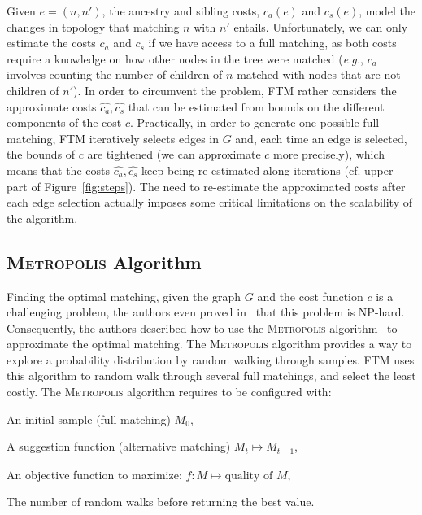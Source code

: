 Given $e=(n, n')$, the ancestry and sibling costs, $c_a(e)$ and $c_s(e)$, model the changes in topology that matching $n$ with $n'$ entails.
Unfortunately, we can only estimate the costs $c_a$ and $c_s$ if we have access to a full matching, as both costs require a knowledge on how other nodes in the tree were matched (\emph{e.g.}, $c_a$ involves counting the number of children of $n$ matched with nodes that are not children of $n'$).
In order to circumvent the problem, FTM rather considers the approximate costs $\hat{c_a}, \hat{c_s}$ that can be estimated from bounds on the different components of the cost $c$.
Practically, in order to generate one possible full matching, FTM iteratively selects edges in $G$ and, each time an edge is selected, the bounds of $c$ are tightened (we can approximate $c$ more precisely), which means that the costs $\hat{c_a}, \hat{c_s}$ keep being re-estimated along iterations (cf. upper part of Figure~\ref{fig:steps}).
The need to re-estimate the approximated costs after each edge selection actually imposes some critical limitations on the scalability of the algorithm.

\subsection{\textsc{Metropolis} Algorithm}\label{sec:metropolis_ftm}%
Finding the optimal matching, given the graph $G$ and the cost function $c$ is a challenging problem, the authors even proved in~\cite{Kumar2011_FTM} that this problem is NP-hard.
Consequently, the authors described how to use the \textsc{Metropolis} algorithm~\cite{metropolis1953equation} to approximate the optimal matching. 
The \textsc{Metropolis} algorithm provides a way to explore a probability distribution by random walking through samples.
FTM uses this algorithm to random walk through several full matchings, and select the least costly.
The \textsc{Metropolis} algorithm requires to be configured with:
\begin{compactenum}
    \item An initial sample (full matching) $M_0$,
    \item A suggestion function (alternative matching) $M_t \mapsto M_{t+1}$,
    \item An objective function to maximize: $f: M \mapsto \text{quality of } M$,
    \item The number of random walks before returning the best value.
\end{compactenum}

